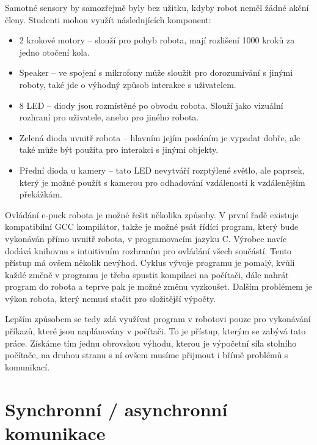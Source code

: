\documentclass[12pt,notitlepage]{report}
\begin{document}
    Samotné sensory by samozřejmě byly bez užitku, kdyby robot neměl žádné
    akční členy. Studenti mohou využít následujících komponent:
    \begin{itemize}
        \item 2 krokové motory -- slouží pro pohyb robota, mají rozlišení 1000
        kroků za jedno otočení kola.

        \item Speaker -- ve spojení s mikrofony může sloužit pro dorozumívání s
        jinými roboty, také jde o výhodný způsob interakce s uživatelem.

        \item 8 LED -- diody jsou rozmístěné po obvodu robota. Slouží jako
        vizuální rozhraní pro uživatele, anebo pro jiného robota.

        \item Zelená dioda uvnitř robota -- hlavním jejím posláním je vypadat
        dobře, ale také může být použita pro interakci s jinými objekty.

        \item Přední dioda u kamery -- tato LED nevytváří rozptýlené světlo,
        ale paprsek, který je možné použít s kamerou pro odhadování vzdálenosti
        k vzdálenějším překážkám.
    \end{itemize}

    Ovládání e-puck robota je možné řešit několika způsoby. V první řadě
    existuje kompatibilní GCC kompilátor, takže je možné psát řídící program,
    který bude vykonáván přímo uvnitř robota, v programovacím jazyku C. Výrobce
    navíc dodává knihovnu s intuitivním rozhraním pro ovládání všech součástí.
    Tento přístup má ovšem několik nevýhod. Cyklus vývoje programu je pomalý,
    kvůli každé změně v programu je třeba spustit kompilaci na počítači, dále
    nahrát program do robota a teprve pak je možné změnu vyzkoušet. Dalším
    problémem je výkon robota, který nemusí stačit pro složitější výpočty.

    Lepším způsobem se tedy zdá využívat program v robotovi pouze pro
    vykonávání příkazů, které jsou naplánovány v počítači. To je přístup,
    kterým se zabývá tato práce. Získáme tím jednu obrovskou výhodu, kterou je
    výpočetní síla stolního počítače, na druhou stranu s ní ovšem musíme
    přijmout i břímě problémů s komunikací.

    \section{Synchronní / asynchronní komunikace}
    \label{sync/async}
\end{document}
